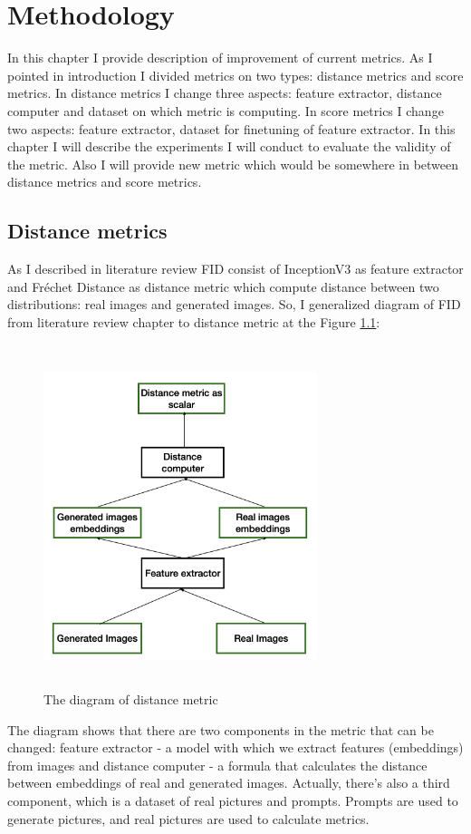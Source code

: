 \chapter{Methodology}
\label{chap:met}
In this chapter I provide description of improvement of current metrics. As I pointed in introduction I divided metrics on two types: distance metrics and score metrics. In distance metrics I change three aspects: feature extractor, distance computer and dataset on which metric is computing. In score metrics I change two aspects: feature extractor, dataset for finetuning of feature extractor. In this chapter I will describe the experiments I will conduct to evaluate the validity of the metric. Also I will provide new metric which would be somewhere in between distance metrics and score metrics.
\section{Distance metrics}
As I described in literature review FID consist of InceptionV3 as feature extractor and Fréchet Distance as distance metric which compute distance between two distributions: real images and generated images. So, I generalized diagram of FID from literature review chapter to distance metric at the Figure \ref{fig:DistanceMetric}:
\begin{figure}[hbt]
\centering
\includegraphics[width=8cm, height=10cm]{figs/distance_metric.png}
\caption{The diagram of distance metric}
\label{fig:DistanceMetric}
\end{figure}


The diagram shows that there are two components in the metric that can be changed: feature extractor - a model with which we extract features (embeddings) from images and distance computer - a formula that calculates the distance between embeddings of real and generated images. Actually, there's also a third component, which is a dataset of real pictures and prompts. Prompts are used to generate pictures, and real pictures are used to calculate metrics.


